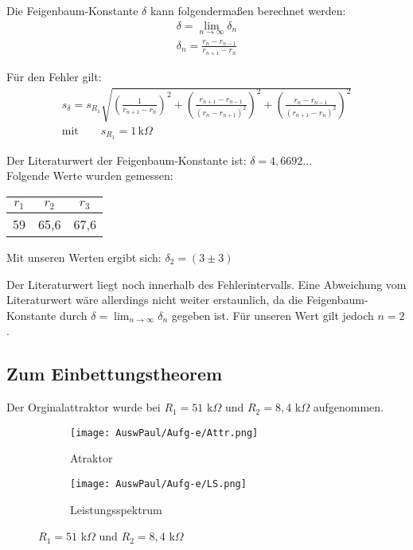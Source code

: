 Die Feigenbaum-Konstante \(\delta\) kann folgendermaßen berechnet werden: 
\begin{align}
    \delta = \lim_{n \to \infty} \delta_n \\
    \delta_n = \frac{r_n - r_{n-1}}{r_{n+1} -r_n}
\end{align}

Für den Fehler gilt: 
\begin{align}
    s_{\delta} = s_{R_1} \sqrt{ \left( \frac{1}{r_{n+1}-r_n}\right)^2 + \left(\frac{r_{n+1}-r_{n-1}}{(r_n - r_{n+1})^2}\right)^2 + \left(\frac{r_n - r_{n-1}}{(r_{n+1}-r_n)^2}\right)^2}\\
    \text{mit} \qquad s_{R_1} = 1 \, \text{k}\Omega
\end{align}

Der Literaturwert der Feigenbaum-Konstante ist: \(\delta = 4,6692...\)\\

Folgende Werte wurden gemessen: \\
\begin{tabular}{c c c}
    $r_1$ & $r_2$ & $r_3$\\
    \hline
    59 & 65,6 & 67,6
\end{tabular}

Mit unseren Werten ergibt sich: \(\delta_2 = (3 \pm 3)\)

Der Literaturwert liegt noch innerhalb des Fehlerintervalls. Eine Abweichung vom Literaturwert wäre allerdings nicht weiter erstaunlich, da die Feigenbaum-Konstante durch \( \delta = \lim_{n \to \infty} \delta_n\) gegeben ist. Für unseren Wert gilt jedoch \( n=2\).

\newpage
\subsection{Zum Einbettungstheorem}

Der Orginalattraktor wurde bei $R_1 = 51$ k$\Omega$ und $R_2 = 8,4$ k$\Omega$ aufgenommen.

\begin{figure}[h]
    \centering
    \begin{subfigure}[b]{0.45\textwidth}
        \centering
        \texttt{[image: AuswPaul/Aufg-e/Attr.png]}
        \caption{Atraktor}
    \end{subfigure}
    \hfill
    \begin{subfigure}[b]{0.45\textwidth}
        \centering
        \texttt{[image: AuswPaul/Aufg-e/LS.png]}
        \caption{Leistungsspektrum}
    \end{subfigure}
    \caption{$R_1 = 51$ k$\Omega$ und $R_2 = 8,4$ k$\Omega$}
\end{figure}

